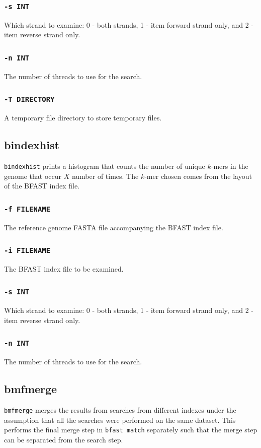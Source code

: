 \documentclass[a4paper,12pt]{book}
\newcommand{\TT}[1]{{\tt #1}} %
\newcommand{\rGFF}{reference genome FASTA file}
\newcommand{\BIF}{BFAST index file} %
\begin{document}
\subsubsection{\TT{-s INT}}
Which strand to examine: 0 - both strands, 1 - item forward strand only, and 2 - item reverse strand only.

\subsubsection{\TT{-n INT}}
The number of threads to use for the search.

\subsubsection{\TT{-T DIRECTORY}}
A temporary file directory to store temporary files.

\subsection{bindexhist}
\label{sec:bindexhist}
\TT{bindexhist} prints a histogram that counts the number of unique $k$-mers in the genome that occur $X$ number of
times.  
The $k$-mer chosen comes from the layout of the \BIF{}.

\subsubsection{\TT{-f FILENAME}}
The \rGFF{} accompanying the \BIF{}.

\subsubsection{\TT{-i FILENAME}}
The \BIF{} to be examined.

\subsubsection{\TT{-s INT}}
Which strand to examine: 0 - both strands, 1 - item forward strand only, and 2 - item reverse strand only.

\subsubsection{\TT{-n INT}}
The number of threads to use for the search.

\subsection{bmfmerge}
\label{sec:bmfmerge}
\TT{bmfmerge} merges the results from searches from different indexes under the assumption that all the searches were performed on the same dataset.
This performs the final merge step in \TT{bfast match} separately such that the merge step can be separated from the search step.
\end{document}
